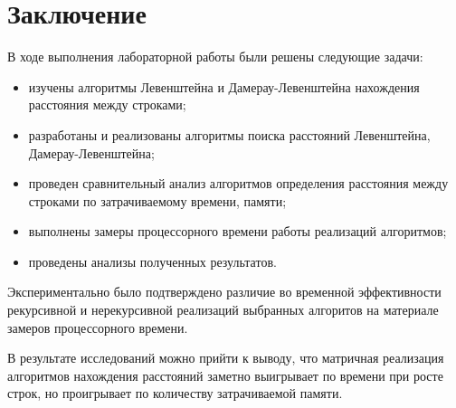 \chapter*{Заключение}

В ходе выполнения лабораторной работы были решены следующие задачи:

\begin{itemize}
	\item изучены алгоритмы Левенштейна и Дамерау-Левенштейна нахождения расстояния между строками;
	\item разработаны и реализованы алгоритмы поиска расстояний Левенштейна,  Дамерау-Левенштейна;
	\item проведен сравнительный анализ алгоритмов определения расстояния между строками по затрачиваемому времени, памяти;
	\item выполнены замеры процессорного времени работы реализаций алгоритмов; 
	\item проведены анализы полученных результатов.
\end{itemize}

Экспериментально было подтверждено различие во временной эффективности рекурсивной и нерекурсивной реализаций выбранных алгоритов на материале замеров процессорного времени.

В результате исследований можно прийти к выводу, что матричная реализация алгоритмов нахождения расстояний заметно выигрывает по времени при росте строк, но проигрывает по количеству затрачиваемой памяти.
